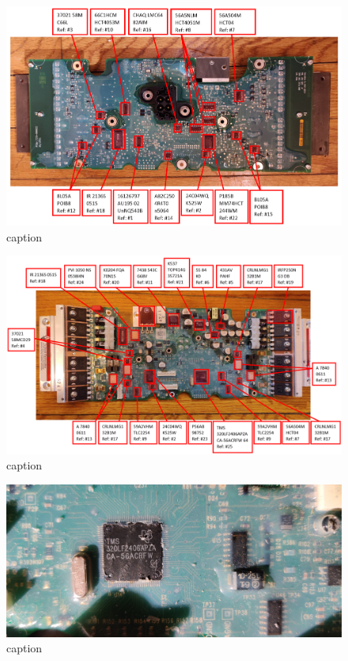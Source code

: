 \documentclass[]{formalLabReport}
\begin{document}
\begin{figure}
    \includegraphics[]{annotatedBoardBack.png}
    \caption{caption}
    \label{fig:annotatedBoardBack.png}
\end{figure}

\begin{figure}
    \includegraphics[]{annotatedBoardFront.png}
    \caption{caption}
    \label{fig:annotatedBoardFront.png}
\end{figure}

\begin{figure}
    \includegraphics[]{chipImg-320LF2406APZA.jpg}
    \caption{caption}
    \label{fig:chipImg-320LF2406APZA.jpg}
\end{figure}
\end{document}
